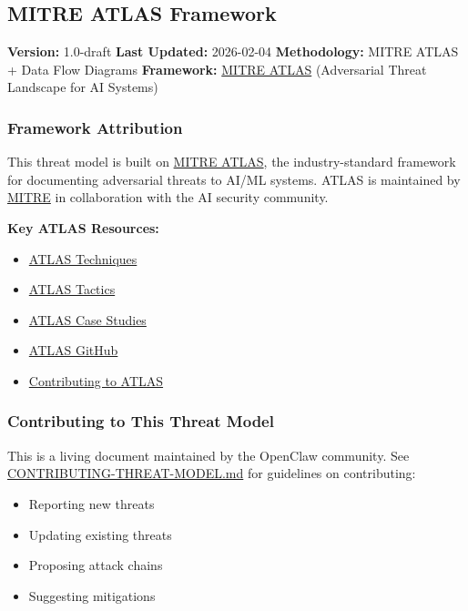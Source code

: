 \subsection{MITRE ATLAS Framework}


\textbf{Version:} 1.0-draft
\textbf{Last Updated:} 2026-02-04
\textbf{Methodology:} MITRE ATLAS + Data Flow Diagrams
\textbf{Framework:} \href{https://atlas.mitre.org/}{MITRE ATLAS} (Adversarial Threat Landscape for AI Systems)

\subsubsection{Framework Attribution}


This threat model is built on \href{https://atlas.mitre.org/}{MITRE ATLAS}, the industry-standard framework for documenting adversarial threats to AI/ML systems. ATLAS is maintained by \href{https://www.mitre.org/}{MITRE} in collaboration with the AI security community.

\textbf{Key ATLAS Resources:}

\begin{itemize}
  \item \href{https://atlas.mitre.org/techniques/}{ATLAS Techniques}
  \item \href{https://atlas.mitre.org/tactics/}{ATLAS Tactics}
  \item \href{https://atlas.mitre.org/studies/}{ATLAS Case Studies}
  \item \href{https://github.com/mitre-atlas/atlas-data}{ATLAS GitHub}
  \item \href{https://atlas.mitre.org/resources/contribute}{Contributing to ATLAS}
\end{itemize}


\subsubsection{Contributing to This Threat Model}


This is a living document maintained by the OpenClaw community. See \href{./CONTRIBUTING-THREAT-MODEL.md}{CONTRIBUTING-THREAT-MODEL.md} for guidelines on contributing:

\begin{itemize}
  \item Reporting new threats
  \item Updating existing threats
  \item Proposing attack chains
  \item Suggesting mitigations
\end{itemize}


